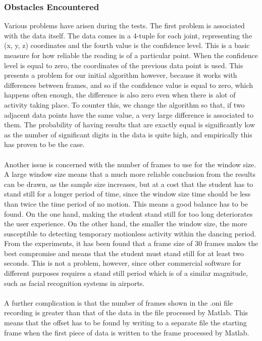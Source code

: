 \documentclass[10pt]{article}
\begin{document}
\subsubsection{Obstacles Encountered}
\noindent
Various problems have arisen during the tests. The first problem is associated with the data itself. The data comes in a 4-tuple for each joint, representing the (x, y, z) coordinates and the fourth value is the confidence level. This is a basic measure for how reliable the reading is of a particular point. When the confidence level is equal to zero, the coordinates of the previous data point is used. This presents a problem for our initial algorithm however, because it works with differences between frames, and so if the confidence value is equal to zero, which happens often enough, the difference is also zero even when there is alot of activity taking place. To counter this, we change the algorithm so that, if two adjacent data points have the same value, a very large difference is associated to them. The probability of having results that are exactly equal is significantly low as the number of significant digits in the data is quite high, and empirically this has proven to be the case.\\\\
\noindent
Another issue is concerned with the number of frames to use for the window size. A large window size means that a much more reliable conclusion from the results can be drawn, as the sample size increases, but at a cost that the student has to stand still for a longer period of time, since the window size time should be less than twice the time period of no motion. This means a good balance has to be found. On the one hand, making the student stand still for too long deteriorates the user experience. On the other hand, the smaller the window size, the more susceptible to detecting temporary motionless activity within the dancing period. From the experiments, it has been found that a frame size of 30 frames makes the best compromise and means that the student must stand still for at least two seconds. This is not a problem, however, since other commercial software for different purposes requires a stand still period which is of a similar magnitude, such as facial recognition systems in airports. \\\\
\noindent
A further complication is that the number of frames shown in the .oni file recording is greater than that of the data in the file processed by Matlab. This means that the offset has to be found by writing to a separate file the starting frame when the first piece of data is written to the frame processed by Matlab. 
\end{document}
